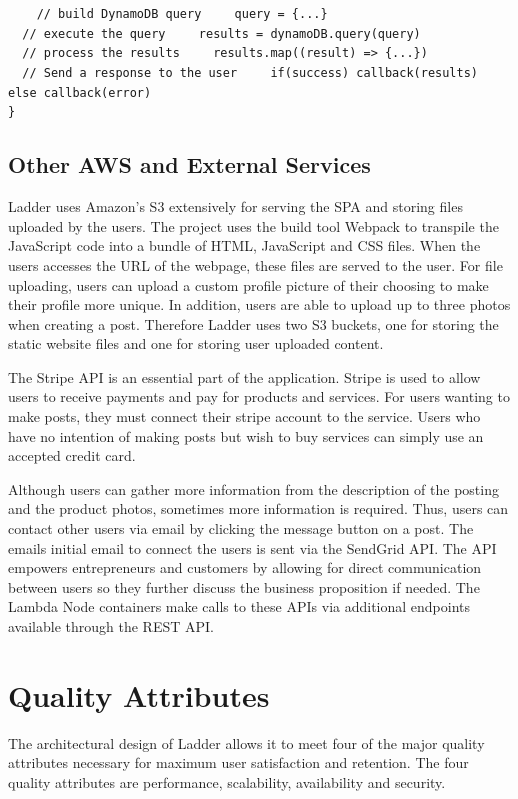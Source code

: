 \documentclass[conference]{IEEEtran}
\begin{document}
\verb|    // build DynamoDB query|
\verb|    query = {...}|\\

\verb|  // execute the query|
\verb|    results = dynamoDB.query(query)|\\

\verb|  // process the results|
\verb|    results.map((result) => {...})|\\

\verb|  // Send a response to the user|
\verb|    if(success) callback(results)|
\verb|    else callback(error)|\\
\verb|}|

\subsection{Other AWS and External Services}
Ladder uses Amazon's S3 extensively for serving the SPA and storing files uploaded by the users. The project uses the build tool Webpack to transpile the JavaScript code into a bundle of HTML, JavaScript and CSS files. When the users accesses the URL of the webpage, these files are served to the user. For file uploading, users can upload a custom profile picture of their choosing to make their profile more unique. In addition, users are able to upload up to three photos when creating a post. Therefore Ladder uses two S3 buckets, one for storing the static website files and one for storing user uploaded content.

The Stripe API is an essential part of the application. Stripe is used to allow users to receive payments and pay for products and services. For users wanting to make posts, they must connect their stripe account to the service. Users who have no intention of making posts but wish to buy services can simply use an accepted credit card.

Although users can gather more information from the description of the posting and the product photos, sometimes more information is required. Thus, users can contact other users via email by clicking the message button on a post. The emails initial email to connect the users is sent via the SendGrid API. The API empowers entrepreneurs and customers by allowing for direct communication between users so they further discuss the business proposition if needed. The Lambda Node containers make calls to these APIs via additional endpoints available through the REST API.

\section{Quality Attributes}
The architectural design of Ladder allows it to meet four of the major quality attributes necessary for maximum user satisfaction and retention. The four quality attributes are performance, scalability, availability and security.
\end{document}
